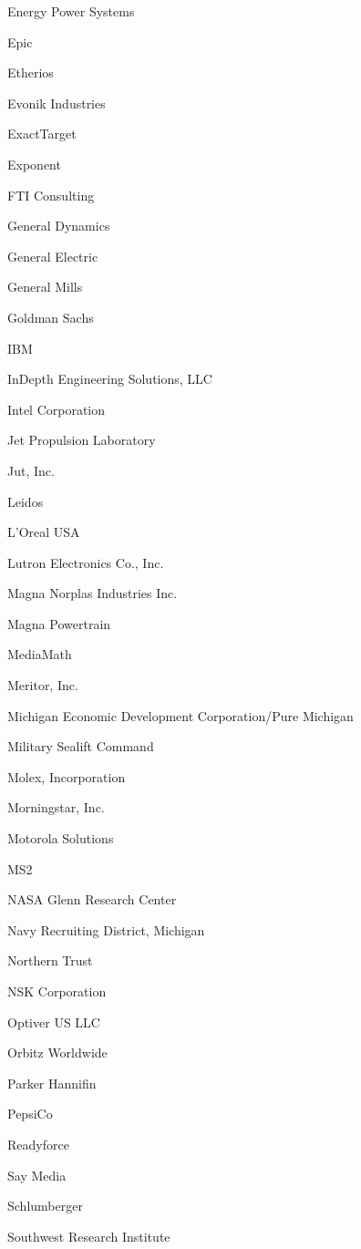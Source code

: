 \documentclass[twoside]{article}
\begin{document}
\begin{center}
\begin{multicols}{5}
\begin{FlushLeft}
\begin{compactitem}
\item Energy Power Systems
\item Epic
\item Etherios
\item Evonik Industries
\item ExactTarget
\item Exponent
\item FTI Consulting
\item General Dynamics
\item General Electric
\item General Mills
\item Goldman Sachs
\item IBM
\item InDepth Engineering Solutions, LLC
\item Intel Corporation
\item Jet Propulsion Laboratory
\item Jut, Inc.
\item Leidos
\item L'Oreal USA
\item Lutron Electronics Co., Inc.
\item Magna Norplas Industries Inc.
\item Magna Powertrain
\item MediaMath
\item Meritor, Inc.
\item Michigan Economic Development Corporation/Pure Michigan
\item Military Sealift Command
\item Molex, Incorporation
\item Morningstar, Inc.
\item Motorola Solutions
\item MS2
\item NASA Glenn Research Center
\item Navy Recruiting District, Michigan
\item Northern Trust
\item NSK Corporation
\item Optiver US LLC
\item Orbitz Worldwide
\item Parker Hannifin
\item PepsiCo
\item Readyforce
\item Say Media
\item Schlumberger
\item Southwest Research Institute

\end{compactitem}
\end{FlushLeft}
\end{multicols}
\end{center}
\end{document}
